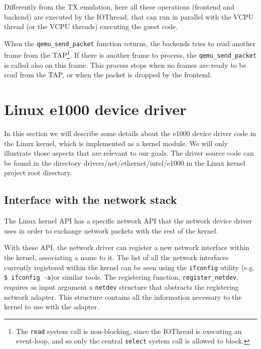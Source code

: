 Differently from the TX emulation, here all these operations (frontend and backend) are executed by the IOThread, that can run in parallel
with the VCPU thread (or the VCPU threads) executing the guest code.

\vspace{0.5cm}

When the \texttt{qemu\_send\_packet} function returns, the backends tries to read another frame from the TAP\footnote{The \texttt{read}
system call is non-blocking, since the IOThread is executing an event-loop, and so only the central \texttt{select} system call is
allowed to block.}. If there is another frame to process, the \texttt{qemu\_send\_packet} is called also on this frame.
This process stops when no frames are ready to be read from the TAP, or when the packet is dropped by the frontend.



\section{Linux e1000 device driver}
In this section we will describe some details about the e1000 device driver code in the Linux kernel, which is implemented as
a kernel module.
We will only illustrate those aspects that are relevant to our goals.
The driver source code can be found in the directory drivers/net/ethernet/intel/e1000 in the Linux kernel project root directory.

\subsection{Interface with the network stack}
\label{sec:netapi}
The Linux kernel API has a specific network API that the network device driver uses in order to exchange network packets with
the rest of the kernel.

With these API, the network driver can register a new network interface within the kernel, associating a name to it.
The list of all the network interfaces currently registered within the kernel can be seen using the \texttt{ifconfig} utility
(e.g. \texttt{\$ ifconfig -a})or similar tools.
The registering function, \texttt{register\_netdev}, requires as input argument a \texttt{netdev} structure that abstracts the
registering network adapter. This structure contains all the information necessary to the kernel to use with the adapter.

